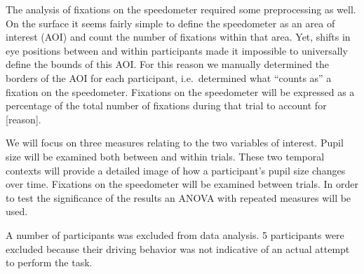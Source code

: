 The analysis of fixations on the speedometer required some preprocessing as well.
On the surface it seems fairly simple to define the speedometer as an area of interest (AOI) and count the number of fixations within that area.
Yet, shifts in eye positions between and within participants made it impossible to universally define the bounds of this AOI.\@
For this reason we manually determined the borders of the AOI for each participant, i.e.\ determined what ``counts as'' a fixation on the speedometer.
Fixations on the speedometer will be expressed as a percentage of the total number of fixations during that trial to account for [reason].

We will focus on three measures relating to the two variables of interest. 
Pupil size will be examined both between and within trials.
These two temporal contexts will provide a detailed image of how a participant's pupil size changes over time.
Fixations on the speedometer will be examined between trials. 
In order to test the significance of the results an ANOVA with repeated measures will be used.

A number of participants was excluded from data analysis.
5 participants were excluded because their driving behavior was not indicative of an actual attempt to perform the task.